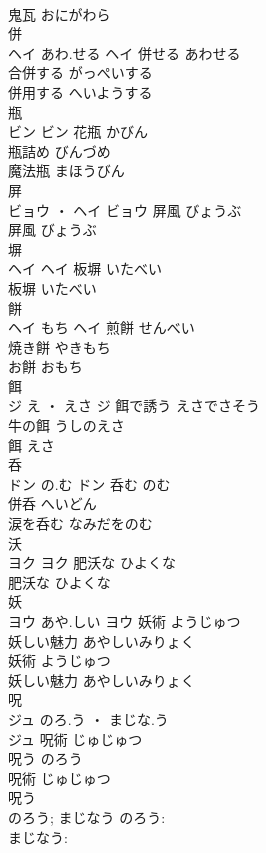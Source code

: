 \documentclass[8pt]{extreport}
\begin{document}
\begin{CJK}{UTF8}{min}
\\	鬼瓦	おにがわら	
\\	併	
\\	ヘイ	あわ.せる	ヘイ	併せる	あわせる	
\\	合併する	がっぺいする	
\\	併用する	へいようする	
\\	瓶	
\\	ビン		ビン	花瓶	かびん	
\\	瓶詰め	びんづめ	
\\	魔法瓶	まほうびん	
\\	屏	
\\	ビョウ ・ ヘイ		ビョウ	屏風	びょうぶ	
\\	屏風	びょうぶ	
\\	塀	
\\	ヘイ		ヘイ	板塀	いたべい	
\\	板塀	いたべい	
\\	餅	
\\	ヘイ	もち	ヘイ	煎餅	せんべい	
\\	焼き餅	やきもち	
\\	お餅	おもち	
\\	餌	
\\	ジ	え ・ えさ	ジ	餌で誘う	えさでさそう	
\\	牛の餌	うしのえさ	
\\	餌	えさ	
\\	呑	
\\	ドン	の.む	ドン	呑む	のむ	
\\	併呑	へいどん	
\\	涙を呑む	なみだをのむ	
\\	沃	
\\	ヨク		ヨク	肥沃な	ひよくな	
\\	肥沃な	ひよくな	
\\	妖	
\\	ヨウ	あや.しい	ヨウ	妖術	ようじゅつ	
\\	妖しい魅力	あやしいみりょく	
\\	妖術	ようじゅつ	
\\	妖しい魅力	あやしいみりょく	
\\	呪	
\\	ジュ	のろ.う ・ まじな.う
\\	ジュ	呪術	じゅじゅつ	
\\	呪う	のろう	
\\	呪術	じゅじゅつ	
\\	呪う 
\\	のろう; まじなう	のろう: 
\\	まじなう: 

\end{CJK}
\end{document}
